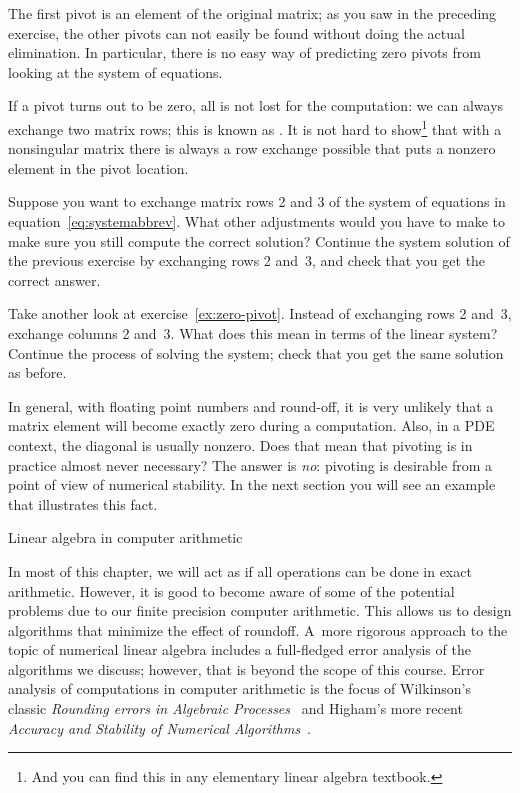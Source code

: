 The first pivot is an element of the original matrix; as you saw in
the preceding exercise, the other pivots can not easily be found
without doing the actual elimination. In particular, there is no easy
way of predicting zero pivots from looking at the system of equations.

If a pivot turns out to be zero, all is not lost for the computation:
we can always exchange two matrix rows; this is known as
.  It is not hard to show\footnote{And you can
  find this in any elementary linear algebra textbook.} that with a
nonsingular matrix there is always a row exchange possible that puts a
nonzero element in the pivot location.

\begin{exercise}
  Suppose you want to exchange matrix rows 2 and 3 of the system of
  equations in equation~\eqref{eq:systemabbrev}. What other
  adjustments would you have to make to make sure you still compute the
  correct solution? 
  Continue the system solution of the previous exercise
  by exchanging rows 2 and~3, and check that you get the correct answer.
\end{exercise}

\begin{exercise}
  Take another look at exercise~\ref{ex:zero-pivot}.  Instead of
  exchanging rows 2 and~3, exchange columns 2 and~3. What does this
  mean in terms of the linear system? Continue the
  process of solving the system; check that you get the same solution
  as before.
\end{exercise}

In general, with floating point numbers and round-off, it is very
unlikely that a matrix element will become exactly zero during a
computation. Also, in a \ac{PDE} context, the diagonal is usually nonzero.
Does that mean that pivoting is in practice almost never
necessary? The answer is \emph{no}: pivoting is desirable from a point
of view of numerical stability. In the next section you will see an
example that illustrates this fact.

 {Linear algebra in computer arithmetic}
\label{sec:linear-arith}

In most of this chapter, we will act as if all operations
can be done in exact arithmetic. However, it is good to become aware
of some of the potential problems due to our finite precision computer
arithmetic. This allows us to design algorithms that minimize the effect
of roundoff. A~more rigorous approach to the topic of numerical linear
algebra includes a full-fledged error analysis of the algorithms we
discuss; however, that is beyond the scope of this course.
%
Error analysis of computations in computer arithmetic is the focus of
Wilkinson's classic {\it Rounding errors in Algebraic
  Processes}~\cite{Wilkinson:roundoff} and Higham's more recent {\it
  Accuracy and Stability of Numerical
  Algorithms}~\cite{Higham:2002:ASN}. 

